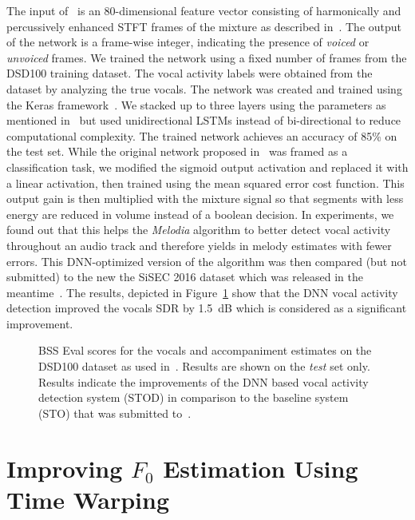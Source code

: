 The input of~\cite{Leglaive15} is an 80-dimensional feature vector consisting of harmonically and percussively enhanced STFT frames of the mixture as described in~\cite{ono08}.
The output of the network is a frame-wise integer, indicating the presence of \emph{voiced} or \emph{unvoiced} frames.
We trained the network using a fixed number of frames from the DSD100 training dataset.
The vocal activity labels were obtained from the dataset by analyzing the true vocals.
The network was created and trained using the Keras framework~\cite{chollet15}.
We stacked up to three layers using the parameters as mentioned in~\cite{Leglaive15} but used unidirectional LSTMs instead of bi-directional to reduce computational complexity.
The trained network achieves an accuracy of 85\% on the test set.
While the original network proposed in~\cite{Leglaive15} was framed as a classification task, we modified the sigmoid output activation and replaced it with a linear activation, then trained using the mean squared error cost function.
This output gain is then multiplied with the mixture signal so that segments with less energy are reduced in volume instead of a boolean decision.
In experiments, we found out that this helps the \emph{Melodia} algorithm to better detect vocal activity throughout an audio track and therefore yields in melody estimates with fewer errors.
This DNN-optimized version of the algorithm was then compared (but not submitted) to the new the SiSEC 2016 dataset which was released in the meantime~\cite{liutkus17}.
The results, depicted in Figure~\ref{fig:05_comparison_sto_stodnn} show that the DNN vocal activity detection improved the vocals SDR by 1.5~dB which is considered as a significant improvement.

\begin{figure}
  \centering
  
  \caption{BSS Eval scores for the vocals and accompaniment estimates on the DSD100 dataset as used in~\cite{liutkus17}. Results are shown on the \emph{test} set only. Results indicate the improvements of the DNN based vocal activity detection system (\textsc{STOD}) in comparison to the baseline system (\textsc{STO}) that was submitted to~\cite{ono15}.}
  \label{fig:05_comparison_sto_stodnn}
\end{figure}

\section[Improving $F_0$ Estimation Using Time Warping]{Improving $F_0$ Estimation Using\\Time Warping} %
\label{sec:f0method}

